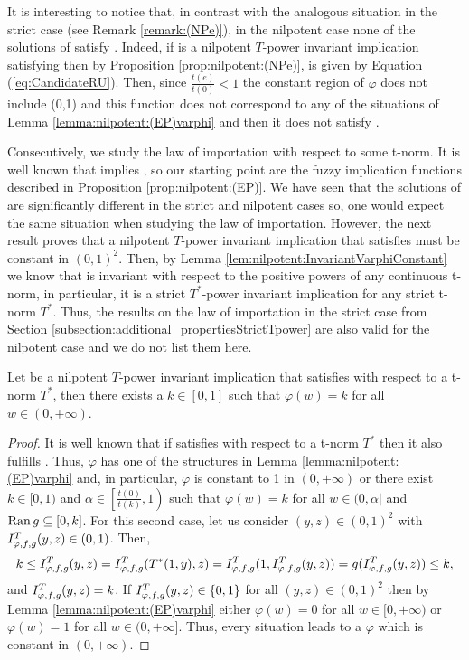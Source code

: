 \begin{remark}\label{remark:strict:(NPe)}
	It is interesting to notice that, in contrast with the analogous situation in the strict case (see Remark \ref{remark:(NPe)}), in the nilpotent case none of the solutions of \EP satisfy \NPe. Indeed, if \IT is a nilpotent $T$-power invariant implication satisfying \NPe then by Proposition \ref{prop:nilpotent:(NPe)}, \IT is given by Equation (\ref{eq:CandidateRU}). Then, since $\frac{t(e)}{t(0)}<1$ the constant region of $\varphi$ does not include (0,1) and this function does not correspond to any of the situations of Lemma \ref{lemma:nilpotent:(EP)varphi} and then it does not satisfy \EP.
\end{remark}

Consecutively, we study the law of importation with respect to some t-norm. It is well known that \LI implies \EP, so our starting point are the fuzzy implication functions described in Proposition \ref{prop:nilpotent:(EP)}. We have seen that the solutions of \EP are significantly different in the strict and nilpotent cases so, one would expect the same situation when studying the law of importation. However, the next result proves that a nilpotent $T$-power invariant implication \IT that satisfies \LI must be constant in $(0,1)^2$. Then, by Lemma \ref{lem:nilpotent:InvariantVarphiConstant} we know that \IT is invariant with respect to the positive powers of any continuous t-norm, in particular, it is a strict $T^*$-power invariant implication for any strict t-norm $T^*$. Thus, the results on the law of importation in the strict case from Section \ref{subsection:additional_propertiesStrictTpower} are also valid for the nilpotent case and we do not list them here.
\pagebreak

\begin{lemma}\label{lem:nilpotent:(LI)}
Let \IT be a nilpotent $T$-power invariant implication that satisfies \LI with respect to a t-norm $T^*$, then there exists a $k \in [0,1]$ such that $\varphi(w)=k$ for all $w \in (0,+\infty)$.
\end{lemma}

\begin{proof}
It is well known that if \IT satisfies \LI with respect to a t-norm $T^*$ then it also fulfills \EP. Thus, $\varphi$ has one of the structures in Lemma \ref{lemma:nilpotent:(EP)varphi} and, in particular, $\varphi$ is constant to 1 in $(0,+\infty)$ or there exist $k \in [0,1)$ and $\alpha \in \left [ \frac{t(0)}{t(k)},1\right)$ such that $\varphi(w)=k$ for all $w \in (0,\alpha|$ and $\operatorname{Ran} g \subseteq [0,k]$. For this second case, let us consider $(y,z) \in (0,1)^2$ with $I^T_{\varphi,f,g}(y,z) \in (0,1)$. Then,
$$k \leq I^T_{\varphi,f,g}(y,z)=I^T_{\varphi,f,g}(T^*(1,y),z)=I^T_{\varphi,f,g}(1,I^T_{\varphi,f,g}(y,z)) = g(I^T_{\varphi,f,g}(y,z)) \leq k,$$
and $I^T_{\varphi,f,g}(y,z)=k$. If $I^T_{\varphi,f,g}(y,z) \in \{0,1\}$ for all $(y,z) \in (0,1)^2$ then by Lemma \ref{lemma:nilpotent:(EP)varphi} either $\varphi(w)=0$ for all $w \in [0,+\infty)$ or $\varphi(w)=1$ for all $w \in (0,+\infty]$. Thus, every situation leads to a $\varphi$  which is constant in $(0,+\infty)$.
\end{proof}

